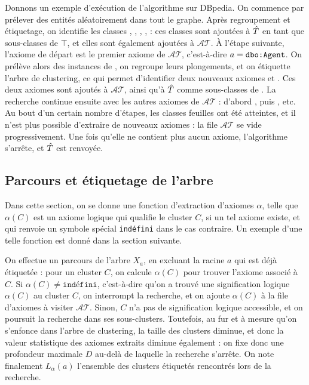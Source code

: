 Donnons un exemple d'exécution de l'algorithme sur DBpedia.
On commence par prélever des entités aléatoirement dans tout le graphe. Après regroupement et étiquetage, on identifie les classes , , , ,  : ces classes sont ajoutées à $\hat{T}$ en tant que sous-classes de $\top$, et elles sont également ajoutées à $\mathcal{AT}$. À l'étape suivante, l'axiome de départ est le premier axiome de $\mathcal{AT}$, c'est-à-dire $a = \texttt{dbo:Agent}$. On prélève alors des instances de , on regroupe leurs plongements, et on étiquette l'arbre de clustering, ce qui permet d'identifier deux nouveaux axiomes  et . Ces deux axiomes sont ajoutés à $\mathcal{AT}$, ainsi qu'à $\hat{T}$ comme sous-classes de . %
La recherche continue ensuite avec les autres axiomes de $\mathcal{AT}$ : d'abord , puis , etc. Au bout d'un certain nombre d'étapes, les classes feuilles ont été atteintes, et il n'est plus possible d'extraire de nouveaux axiomes : la file $\mathcal{AT}$ se vide progressivement. Une fois qu'elle ne contient plus aucun axiome, l'algorithme s'arrête, et $\hat{T}$ est renvoyée.


\subsection{Parcours et étiquetage de l'arbre}
\label{subsec:texp-tree-labelling}


Dans cette section, on se donne une fonction d'extraction d'axiomes $\alpha$, telle que $\alpha(C)$ est un axiome logique qui qualifie le cluster $C$, si un tel axiome existe, et qui renvoie un symbole spécial \texttt{indéfini} dans le cas contraire. 
Un exemple d'une telle fonction est donné dans la section suivante. 

On effectue un parcours de l'arbre $X_a$, en excluant la racine $a$ qui est déjà étiquetée : pour un cluster $C$, on calcule $\alpha(C)$ pour trouver l'axiome associé à $C$. 
Si $\alpha(C) \neq \texttt{indéfini}$, c'est-à-dire qu'on a trouvé une signification logique $\alpha(C)$ au cluster $C$, on interrompt la recherche, et on ajoute $\alpha(C)$ à la file d'axiomes à visiter 
$\mathcal{AT}$. Sinon, $C$ n'a pas de signification logique accessible, et on poursuit la recherche dans ses sous-clusters. Toutefois, au fur et à mesure qu'on s'enfonce dans l'arbre de clustering, la taille des clusters diminue, et donc la valeur statistique des axiomes extraits diminue également : on fixe donc une profondeur maximale $D$ au-delà de laquelle la recherche s'arrête.
%
On note finalement $L_\alpha(a)$ l'ensemble des clusters étiquetés rencontrés lors de la recherche.


